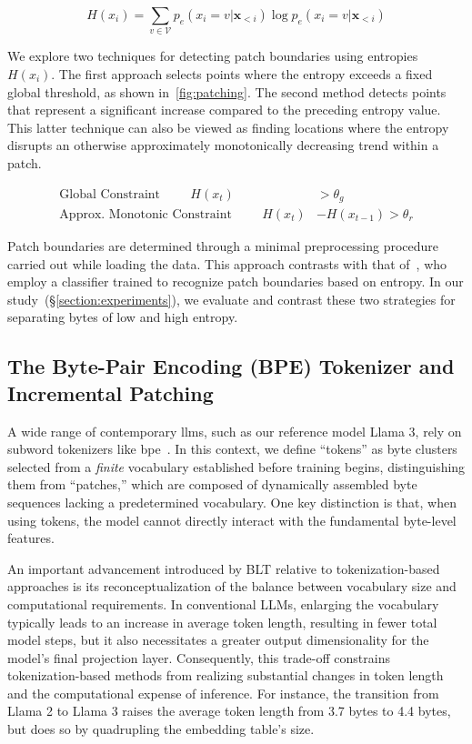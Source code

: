 \begin{equation}
H(x_i) = \sum_{v \in \mathcal{V}} p_{e}(x_i=v|\pmb{x}_{<i}) \log p_{e}(x_i=v|\pmb{x}_{<i})
\end{equation}

We explore two techniques for detecting patch boundaries using entropies $H(x_i)$. The first approach selects points where the entropy exceeds a fixed global threshold, as shown in~\autoref{fig:patching}. The second method detects points that represent a significant increase compared to the preceding entropy value. This latter technique can also be viewed as finding locations where the entropy disrupts an otherwise approximately monotonically decreasing trend within a patch.

\begin{align*}
    \text{Global Constraint}\hspace{1cm}H(x_t)& > \theta_g\\
    \text{Approx. Monotonic Constraint}\hspace{1cm}H(x_t)& - H(x_{t-1}) > \theta_r
\end{align*}

Patch boundaries are determined through a minimal preprocessing procedure carried out while loading the data. This approach contrasts with that of~\citet{nawrot-etal-2023-efficient}, who employ a classifier trained to recognize patch boundaries based on entropy. In our study~(\S\ref{section:experiments}), we evaluate and contrast these two strategies for separating bytes of low and high entropy.

\subsection{The Byte-Pair Encoding (BPE) Tokenizer and Incremental Patching}
\label{section:incremental-patching}
\label{section:bpe-patch}

A wide range of contemporary llms, such as our reference model Llama 3, rely on subword tokenizers like bpe~\citep{gage1994new, sennrich-etal-2016-neural}. In this context, we define ``tokens'' as byte clusters selected from a \textit{finite} vocabulary established before training begins, distinguishing them from ``patches,'' which are composed of dynamically assembled byte sequences lacking a predetermined vocabulary. One key distinction is that, when using tokens, the model cannot directly interact with the fundamental byte-level features.

An important advancement introduced by {\textsc BLT} relative to tokenization-based approaches is its reconceptualization of the balance between vocabulary size and computational requirements. In conventional LLMs, enlarging the vocabulary typically leads to an increase in average token length, resulting in fewer total model steps, but it also necessitates a greater output dimensionality for the model's final projection layer. Consequently, this trade-off constrains tokenization-based methods from realizing substantial changes in token length and the computational expense of inference. For instance, the transition from Llama 2 to Llama 3 raises the average token length from 3.7 bytes to 4.4 bytes, but does so by quadrupling the embedding table’s size.

